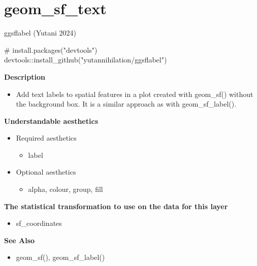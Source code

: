\documentclass[
  letterpaper,
  DIV=11,
  numbers=noendperiod]{scrreprt}
\newenvironment{Shaded}{\begin{snugshade}}{\end{snugshade}}
\newcommand{\CommentTok}[1]{\textcolor[rgb]{0.37,0.37,0.37}{#1}}
\newcommand{\FunctionTok}[1]{\textcolor[rgb]{0.28,0.35,0.67}{#1}}
\newcommand{\NormalTok}[1]{\textcolor[rgb]{0.00,0.23,0.31}{#1}}
\newcommand{\SpecialCharTok}[1]{\textcolor[rgb]{0.37,0.37,0.37}{#1}}
\newcommand{\StringTok}[1]{\textcolor[rgb]{0.13,0.47,0.30}{#1}}
\providecommand{\tightlist}{%
  \setlength{\itemsep}{0pt}\setlength{\parskip}{0pt}}\usepackage{longtable,booktabs,array}
\begin{document}
\section{geom\_sf\_text}\label{geom_sf_text}

ggsflabel (Yutani 2024)

\begin{Shaded}
\begin{Highlighting}[]
\CommentTok{\# install.packages("devtools")}
\NormalTok{devtools}\SpecialCharTok{::}\FunctionTok{install\_github}\NormalTok{(}\StringTok{"yutannihilation/ggsflabel"}\NormalTok{)}
\end{Highlighting}
\end{Shaded}

\textbf{Description}

\begin{itemize}
\tightlist
\item
  Add text labels to spatial features in a plot created with geom\_sf()
  without the background box. It is a similar approach as with
  geom\_sf\_label().
\end{itemize}

\textbf{Understandable aesthetics}

\begin{itemize}
\tightlist
\item
  Required aesthetics

  \begin{itemize}
  \tightlist
  \item
    label
  \end{itemize}
\item
  Optional aesthetics

  \begin{itemize}
  \tightlist
  \item
    alpha, colour, group, fill
  \end{itemize}
\end{itemize}

\textbf{The statistical transformation to use on the data for this
layer}

\begin{itemize}
\tightlist
\item
  sf\_coordinates
\end{itemize}

\textbf{See Also}

\begin{itemize}
\tightlist
\item
  geom\_sf(), geom\_sf\_label()
\end{itemize}
\end{document}
